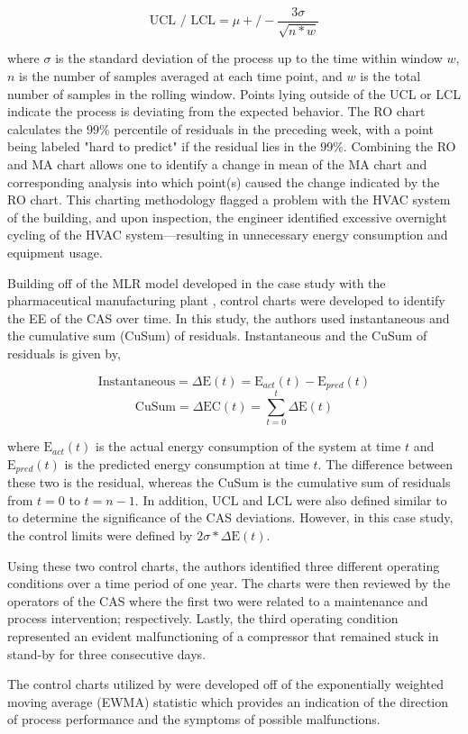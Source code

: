 $$\text{UCL / LCL} = \mu +/- \frac{3\sigma}{\sqrt{n * w}}$$

where $\sigma$ is the standard deviation of the process up to the time within window $w$, $n$ is the number of samples averaged at each time point, and $w$ is the total number of samples in the rolling window. Points lying outside of the UCL or LCL indicate the process is deviating from the expected behavior. The RO chart calculates the $99\%$ percentile of residuals in the preceding week, with a point being labeled "hard to predict" if the residual lies in the $99\%$. Combining the RO and MA chart allows one to identify a change in mean of the MA chart and corresponding analysis into which point(s) caused the change indicated by the RO chart. This charting methodology flagged a problem with the HVAC system of the building, and upon inspection, the engineer identified excessive overnight cycling of the HVAC system—resulting in unnecessary energy consumption and equipment usage. 

Building off of the MLR model developed in the case study with the pharmaceutical manufacturing plant \cite{cas}, control charts were developed to identify the EE of the CAS over time. In this study, the authors used instantaneous and the cumulative sum (CuSum) of residuals. Instantaneous and the CuSum of residuals is given by,

$$\text{Instantaneous} = \Delta \text{E}(t) = \text{E}_{act}(t) - \text{E}_{pred}(t)$$
$$\text{CuSum} = \Delta \text{EC}(t) = \sum_{t=0}^t\Delta \text{E}(t)$$

where $\text{E}_{act}(t)$ is the actual energy consumption of the system at time $t$ and $\text{E}_{pred}(t)$ is the predicted energy consumption at time $t$. The difference between these two is the residual, whereas the CuSum is the cumulative sum of residuals from $t=0$ to $t=n-1$. In addition, UCL and LCL were also defined similar to \cite{tightening} to determine the significance of the CAS deviations. However, in this case study, the control limits were defined by $2 \sigma * \Delta \text{E}(t)$. 

Using these two control charts, the authors identified three different operating conditions over a time period of one year. The charts were then reviewed by the operators of the CAS where the first two were related to a maintenance and process intervention; respectively. Lastly, the third operating condition represented an evident malfunctioning of a compressor that remained stuck in stand-by for three consecutive days.


The control charts utilized by \cite{boiler} were developed off of the exponentially weighted moving average (EWMA) statistic which provides an indication of the direction of process performance and the symptoms of possible malfunctions.